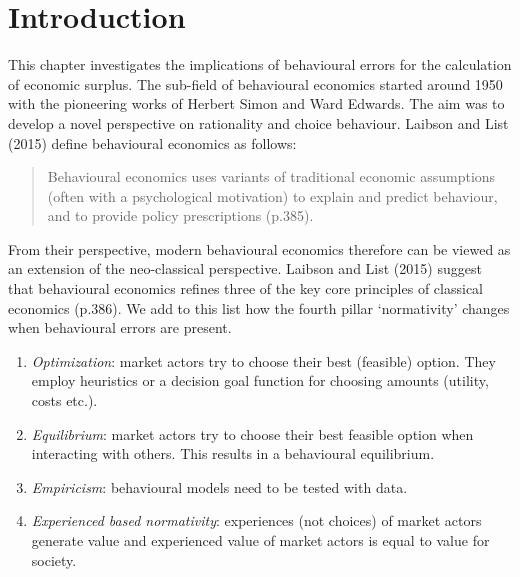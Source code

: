 \documentclass[
]{book}
\providecommand{\tightlist}{%
  \setlength{\itemsep}{0pt}\setlength{\parskip}{0pt}}
\begin{document}
\hypertarget{introduction-4}{%
\section{Introduction}\label{introduction-4}}

This chapter investigates the implications of behavioural errors for the calculation of economic surplus. The sub-field of behavioural economics started around 1950 with the pioneering works of Herbert Simon and Ward Edwards. The aim was to develop a novel perspective on rationality and choice behaviour. Laibson and List (2015) define behavioural economics as follows:

\begin{quote}
Behavioural economics uses variants of traditional economic assumptions (often with a psychological motivation) to explain and predict behaviour, and to provide policy prescriptions (p.385).
\end{quote}

From their perspective, modern behavioural economics therefore can be viewed as an extension of the neo-classical perspective. Laibson and List (2015) suggest that behavioural economics refines three of the key core principles of classical economics (p.386). We add to this list how the fourth pillar `normativity' changes when behavioural errors are present.

\begin{enumerate}
\def\labelenumi{(\roman{enumi})}
\tightlist
\item
  \emph{Optimization}: market actors try to choose their best (feasible) option. They employ heuristics or a decision goal function for choosing amounts (utility, costs etc.).
\item
  \emph{Equilibrium}: market actors try to choose their best feasible option when interacting with others. This results in a behavioural equilibrium.
\item
  \emph{Empiricism}: behavioural models need to be tested with data.
\item
  \emph{Experienced based normativity}: experiences (not choices) of market actors generate value and experienced value of market actors is equal to value for society.
\end{enumerate}
\end{document}
